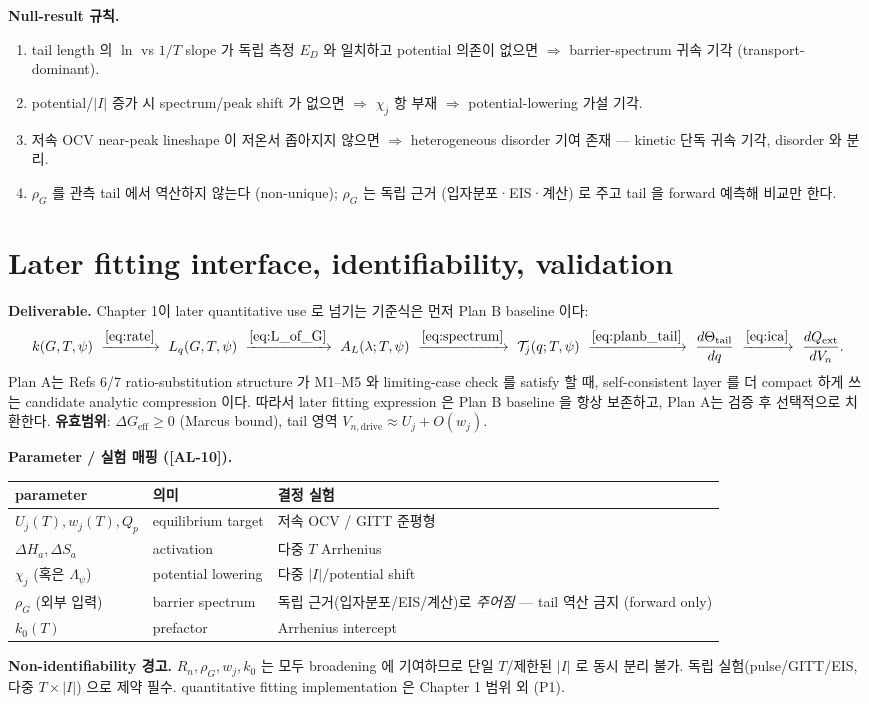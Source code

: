 \documentclass[11pt,a4paper]{article}
\newcommand{\eff}{\mathrm{eff}}
\newcommand{\dimedrive}{\mathrm{drive}}
\newcommand{\ext}{\mathrm{ext}}
\newcommand{\AL}[1]{\textsf{[AL-#1]}}
\begin{document}
\textbf{Null-result 규칙.}
\begin{enumerate}[label=(N\arabic*)]
\item tail length 의 $\ln$ vs $1/T$ slope 가 독립 측정 $E_D$ 와 일치하고 potential 의존이
  없으면 $\Rightarrow$ barrier-spectrum 귀속 기각 (transport-dominant).
\item potential/$|I|$ 증가 시 spectrum/peak shift 가 없으면 $\Rightarrow$ $\chi_j$ 항 부재
  $\Rightarrow$ potential-lowering 가설 기각.
\item 저속 OCV near-peak lineshape 이 저온서 좁아지지 않으면 $\Rightarrow$ heterogeneous
  disorder 기여 존재 — kinetic 단독 귀속 기각, disorder 와 분리.
\item $\rho_G$ 를 관측 tail 에서 역산하지 않는다 (non-unique); $\rho_G$ 는 독립 근거
  (입자분포·EIS·계산) 로 주고 tail 을 forward 예측해 비교만 한다.
\end{enumerate}

\section{Later fitting interface, identifiability, validation}\label{sec:fitting}
\textbf{Deliverable.} Chapter 1이 later quantitative use 로 넘기는 기준식은 먼저 Plan B
baseline 이다:
\[
k(G,T,\psi)\ \xrightarrow{\eqref{eq:rate}}\ 
L_q(G,T,\psi)\ \xrightarrow{\eqref{eq:L_of_G}}\ 
A_L(\lambda;T,\psi)\ \xrightarrow{\eqref{eq:spectrum}}\ 
\mathcal T_j(q;T,\psi)\ \xrightarrow{\eqref{eq:planb_tail}}\ 
\frac{d\Theta_\mathrm{tail}}{dq}\ \xrightarrow{\eqref{eq:ica}}\ 
\frac{dQ_\ext}{dV_n}.
\]
Plan A는 Refs 6/7 ratio-substitution structure 가 M1--M5 와 limiting-case check 를 satisfy 할 때,
self-consistent layer 를 더 compact 하게 쓰는 candidate analytic compression 이다. 따라서 later
fitting expression 은 Plan B baseline 을 항상 보존하고, Plan A는 검증 후 선택적으로 치환한다.
\textbf{유효범위}: $\Delta G_\eff\ge0$ (Marcus bound), tail 영역
$V_{n,\dimedrive}\approx U_j+O(w_j)$.

\textbf{Parameter / 실험 매핑 (\AL{10}).}
\begin{longtable}{p{0.26\textwidth} p{0.30\textwidth} p{0.38\textwidth}}
\toprule parameter & 의미 & 결정 실험 \\ \midrule \endhead
$U_j(T),w_j(T),Q_p$ & equilibrium target & 저속 OCV / GITT 준평형 \\
$\Delta H_a,\Delta S_a$ & activation & 다중 $T$ Arrhenius \\
$\chi_j$ (혹은 $\Lambda_\psi$) & potential lowering & 다중 $|I|$/potential shift \\
$\rho_G$ (외부 입력) & barrier spectrum & 독립 근거(입자분포/EIS/계산)로 \emph{주어짐} — tail 역산 금지 (forward only) \\
$k_0(T)$ & prefactor & Arrhenius intercept \\
\bottomrule
\end{longtable}
\textbf{Non-identifiability 경고.} $R_n,\rho_G,w_j,k_0$ 는 모두 broadening 에 기여하므로
단일 $T$/제한된 $|I|$ 로 동시 분리 불가. 독립 실험(pulse/GITT/EIS, 다중 $T\times|I|$) 으로
제약 필수. quantitative fitting implementation 은 Chapter 1 범위 외 (P1).
\end{document}
